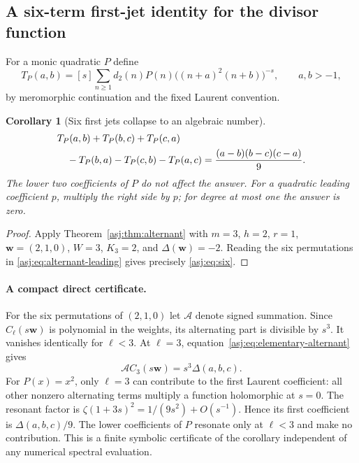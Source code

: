 \documentclass[11pt]{article}
\numberwithin{equation}{section}
\newtheorem{corollary}[theorem]{Corollary}
\theoremstyle{definition}\newtheorem{definition}[theorem]{Definition}
\theoremstyle{remark}\newtheorem{remark}[theorem]{Remark}\newtheorem{example}[theorem]{Example}
\begin{document}
\subsection{A six-term first-jet identity for the divisor function}
For a monic quadratic $P$ define
\begin{equation}\label{asj:eq:Tdef}
 T_P(a,b)=[s]\sum_{n\ge1}d_2(n)P(n)
                  \bigl((n+a)^2(n+b)\bigr)^{-s},\qquad a,b>-1,
\end{equation}
by meromorphic continuation and the fixed Laurent convention.

\begin{corollary}[Six first jets collapse to an algebraic number]
\label{asj:thm:six}
\begin{align}\label{asj:eq:six}
 &T_P(a,b)+T_P(b,c)+T_P(c,a)\notag\\
 &\quad-T_P(b,a)-T_P(c,b)-T_P(a,c)
       =\frac{(a-b)(b-c)(c-a)}9.
\end{align}
The lower two coefficients of $P$ do not affect the answer. For a
quadratic leading coefficient $p$, multiply the right side by $p$;
for degree at most one the answer is zero.
\end{corollary}
\begin{proof}
Apply Theorem~\ref{asj:thm:alternant} with $m=3$, $h=2$, $r=1$,
$\boldsymbol w=(2,1,0)$, $W=3$, $K_3=2$, and
$\Delta(\boldsymbol w)=-2$. Reading the six permutations in
\eqref{asj:eq:alternant-leading} gives precisely \eqref{asj:eq:six}.
\end{proof}

\paragraph{A compact direct certificate.}
For the six permutations of $(2,1,0)$ let $\mathcal A$ denote signed
summation. Since $C_\ell(s\boldsymbol w)$ is polynomial in the weights,
its alternating part is divisible by $s^3$. It vanishes identically for
$\ell<3$. At $\ell=3$, equation~\eqref{asj:eq:elementary-alternant} gives
\[
 \mathcal A C_3(s\boldsymbol w)=s^3\Delta(a,b,c).
\]
For $P(x)=x^2$, only $\ell=3$ can contribute to the first Laurent
coefficient: all other nonzero alternating terms multiply a function
holomorphic at $s=0$. The resonant factor is
$\zeta(1+3s)^2=1/(9s^2)+O(s^{-1})$. Hence its first coefficient is
$\Delta(a,b,c)/9$. The lower coefficients of $P$ resonate only at
$\ell<3$ and make no contribution. This is a finite symbolic certificate
of the corollary independent of any numerical spectral evaluation.
\end{document}
